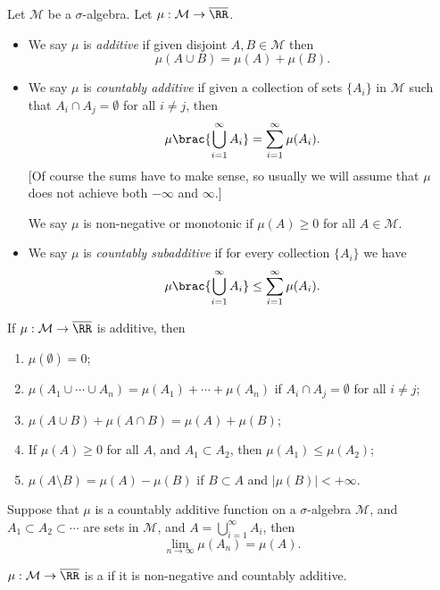 \begin{definition}
Let $\mathcal{M}$ be a $\sigma$-algebra. Let $\mu:\mathcal{M}\to\overline{\RR}$.
\begin{itemize}
\item We say $\mu$ is \emph{additive} if given disjoint $A,B\in\mathcal{M}$ then
\[\mu(A\cup B)=\mu(A)+\mu(B).\]
\item We say $\mu$ is \emph{countably additive} if given a collection of sets $\{A_i\}$ in $\mathcal{M}$ such that $A_i\cap A_j=\emptyset$ for all $i\neq j$, then
\[\mu\brac{\bigcup_{i=1}^{\infty}A_i}=\sum_{i=1}^{\infty}\mu(A_i).\]
[Of course the sums have to make sense, so usually we will assume that $\mu$ does not achieve both $-\infty$ and $\infty$.]

We say $\mu$ is non-negative or monotonic if $\mu(A)\ge0$ for all $A\in\mathcal{M}$.

\item We say $\mu$ is \emph{countably subadditive} if for every collection $\{A_i\}$ we have
\[\mu\brac{\bigcup_{i=1}^{\infty}A_i}\le\sum_{i=1}^{\infty}\mu(A_i).\]
\end{itemize}
\end{definition}

\begin{lemma}
If $\mu:\mathcal{M}\to\overline{\RR}$ is additive, then
\begin{enumerate}[label=(\roman*)]
\item $\mu(\emptyset)=0$;
\item $\mu(A_1\cup\cdots\cup A_n)=\mu(A_1)+\cdots+\mu(A_n)$ if $A_i\cap A_j=\emptyset$ for all $i\neq j$;
\item $\mu(A\cup B)+\mu(A\cap B)=\mu(A)+\mu(B)$;
\item If $\mu(A)\ge0$ for all $A$, and $A_1\subset A_2$, then $\mu(A_1)\le\mu(A_2)$;
\item $\mu(A\setminus B)=\mu(A)-\mu(B)$ if $B\subset A$ and $|\mu(B)|<+\infty$.
\end{enumerate}
\end{lemma}

\begin{lemma}[Limits]
Suppose that $\mu$ is a countably additive function on a $\sigma$-algebra $\mathcal{M}$, and $A_1\subset A_2\subset\cdots$ are sets in $\mathcal{M}$, and $A=\bigcup_{i=1}^{\infty}A_i$, then
\[\lim_{n\to\infty}\mu(A_n)=\mu(A).\]
\end{lemma}

\begin{definition}
$\mu:\mathcal{M}\to\overline{\RR}$ is a  if it is non-negative and countably additive.
\end{definition}

